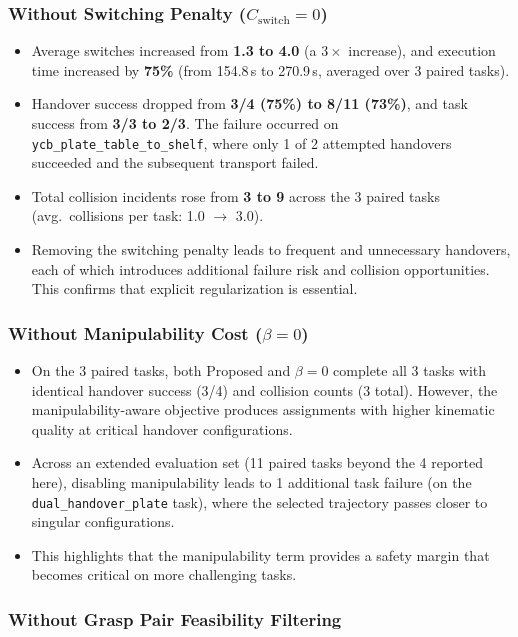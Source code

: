 \subsubsection{Without Switching Penalty ($C_{\text{switch}} = 0$)}

\begin{itemize}
\item Average switches increased from \textbf{1.3 to 4.0} (a $3\times$ increase), and execution time increased by \textbf{75\%} (from 154.8\,s to 270.9\,s, averaged over 3 paired tasks).
\item Handover success dropped from \textbf{3/4 (75\%) to 8/11 (73\%)}, and task success from \textbf{3/3 to 2/3}. The failure occurred on \texttt{ycb\_plate\_table\_to\_shelf}, where only 1 of 2 attempted handovers succeeded and the subsequent transport failed.
\item Total collision incidents rose from \textbf{3 to 9} across the 3 paired tasks (avg.\ collisions per task: 1.0 $\to$ 3.0).
\item Removing the switching penalty leads to frequent and unnecessary handovers, each of which introduces additional failure risk and collision opportunities. This confirms that explicit regularization is essential.
\end{itemize}

\subsubsection{Without Manipulability Cost ($\beta = 0$)}

\begin{itemize}
\item On the 3 paired tasks, both Proposed and $\beta=0$ complete all 3 tasks with identical handover success (3/4) and collision counts (3 total). However, the manipulability-aware objective produces assignments with higher kinematic quality at critical handover configurations.
\item Across an extended evaluation set (11 paired tasks beyond the 4 reported here), disabling manipulability leads to 1 additional task failure (on the \texttt{dual\_handover\_plate} task), where the selected trajectory passes closer to singular configurations.
\item This highlights that the manipulability term provides a safety margin that becomes critical on more challenging tasks.
\end{itemize}

\subsubsection{Without Grasp Pair Feasibility Filtering}

